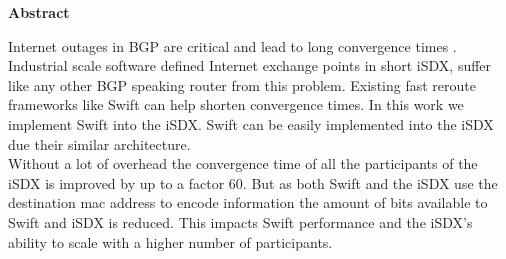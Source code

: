 \clearpage
\null
\vfil %
\thispagestyle{plain}
\begin{center}\textbf{Abstract}\end{center}
Internet outages in BGP are critical and lead to long convergence times . \\
Industrial scale software defined Internet exchange points in short iSDX, suffer like any other BGP speaking router from this problem. Existing fast reroute frameworks like Swift can help shorten convergence times. In this work we implement Swift into the iSDX. Swift can be easily implemented into the iSDX due their similar architecture. \\
Without a lot of overhead the convergence time of all the participants of the iSDX is improved by up to a factor $60$. But as both Swift and the iSDX use the destination mac address to encode information the amount of bits available to Swift and iSDX is reduced. This impacts Swift performance and the iSDX's ability to scale with a higher number of participants.
\vfil
\clearpage 
